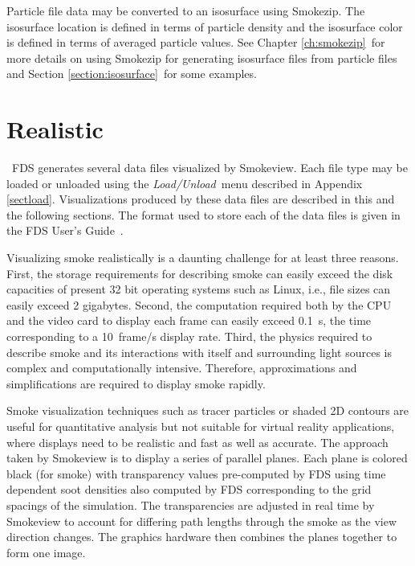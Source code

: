 \documentclass[11pt,twoside]{book}
\begin{document}
Particle file data may be converted to an isosurface using
Smokezip.  The isosurface location is defined in terms of particle
density and the isosurface color is defined in terms of averaged
particle values. See  Chapter \ref{ch:smokezip}\ for more details
on using Smokezip for generating isosurface files from particle
files and Section \ref{section:isosurface}\ for some examples.

\section{Realistic}
\label{section:volsmoke}\ FDS generates several data files
visualized by Smokeview. Each file type may be loaded or unloaded
using the {\em Load/Unload}\ menu described in Appendix
\ref{sectload}. Visualizations produced by these data files are
described in this and the following sections. The format used to
store each of the data files is given in the FDS User's
Guide~\cite{FDS_Users_Guide}.

Visualizing smoke realistically is a daunting challenge for at
least three reasons. First, the storage requirements for
describing smoke can easily exceed the disk capacities of present
32 bit operating systems such as Linux, i.e., file sizes can easily
exceed 2 gigabytes. Second, the computation required both by the
CPU and the video card to display each frame can easily exceed
0.1~s, the time corresponding to a 10~frame/s display rate. Third,
the physics required to describe smoke and its interactions with
itself and surrounding light sources is complex and
computationally intensive. Therefore, approximations and
simplifications are required to display smoke rapidly.

Smoke visualization techniques such as tracer particles or shaded
2D contours are useful for quantitative analysis but not suitable
for virtual reality applications, where displays need to be
realistic and fast as well as accurate. The approach taken by
Smokeview is to display a series of parallel planes.  Each plane
is colored black (for smoke) with transparency values pre-computed
by FDS using time dependent soot densities also computed by FDS
corresponding to the grid spacings of the simulation. The
transparencies are adjusted in real time by Smokeview to account
for differing path lengths through the smoke as the view direction
changes. The graphics hardware then combines the planes together
to form one image.
\end{document}

